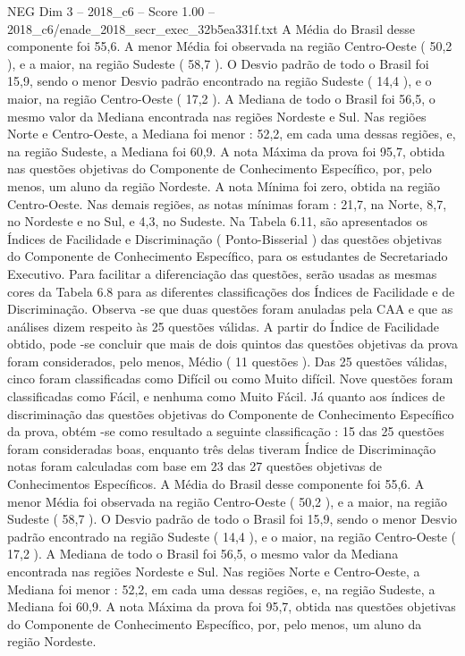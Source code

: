 \begin{textsample}{NEG Dim 3 – 2018\_c6 – Score 1.00 – 2018\_c6/enade\_2018\_secr\_exec\_32b5ea331f.txt}
A Média do Brasil desse componente foi 55,6.
A menor Média foi observada na região Centro-Oeste ( 50,2 ), e a maior, na região Sudeste ( 58,7 ).
O Desvio padrão de todo o Brasil foi 15,9, sendo o menor Desvio padrão encontrado na região Sudeste ( 14,4 ), e o maior, na região Centro-Oeste ( 17,2 ).
A Mediana de todo o Brasil foi 56,5, o mesmo valor da Mediana encontrada nas regiões Nordeste e Sul.
Nas regiões Norte e Centro-Oeste, a Mediana foi menor : 52,2, em cada uma dessas regiões, e, na região Sudeste, a Mediana foi 60,9.
A nota Máxima da prova foi 95,7, obtida nas questões objetivas do Componente de Conhecimento Específico, por, pelo menos, um aluno da região Nordeste.
A nota Mínima foi zero, obtida na região Centro-Oeste.
Nas demais regiões, as notas mínimas foram : 21,7, na Norte, 8,7, no Nordeste e no Sul, e 4,3, no Sudeste.
Na Tabela 6.11, são apresentados os Índices de Facilidade e Discriminação ( Ponto-Bisserial ) das questões objetivas do Componente de Conhecimento Específico, para os estudantes de Secretariado Executivo.
Para facilitar a diferenciação das questões, serão usadas as mesmas cores da Tabela 6.8 para as diferentes classificações dos Índices de Facilidade e de Discriminação.
Observa -se que duas questões foram anuladas pela CAA e que as análises dizem respeito às 25 questões válidas.
A partir do Índice de Facilidade obtido, pode -se concluir que mais de dois quintos das questões objetivas da prova foram considerados, pelo menos, Médio ( 11 questões ).
Das 25 questões válidas, cinco foram classificadas como Difícil ou como Muito difícil.
Nove questões foram classificadas como Fácil, e nenhuma como Muito Fácil.
Já quanto aos índices de discriminação das questões objetivas do Componente de Conhecimento Específico da prova, obtém -se como resultado a seguinte classificação : 15 das 25 questões foram consideradas boas, enquanto três delas tiveram Índice de Discriminação notas foram calculadas com base em 23 das 27 questões objetivas de Conhecimentos Específicos.
A Média do Brasil desse componente foi 55,6.
A menor Média foi observada na região Centro-Oeste ( 50,2 ), e a maior, na região Sudeste ( 58,7 ).
O Desvio padrão de todo o Brasil foi 15,9, sendo o menor Desvio padrão encontrado na região Sudeste ( 14,4 ), e o maior, na região Centro-Oeste ( 17,2 ).
A Mediana de todo o Brasil foi 56,5, o mesmo valor da Mediana encontrada nas regiões Nordeste e Sul.
Nas regiões Norte e Centro-Oeste, a Mediana foi menor : 52,2, em cada uma dessas regiões, e, na região Sudeste, a Mediana foi 60,9.
A nota Máxima da prova foi 95,7, obtida nas questões objetivas do Componente de Conhecimento Específico, por, pelo menos, um aluno da região Nordeste.

\end{textsample}
